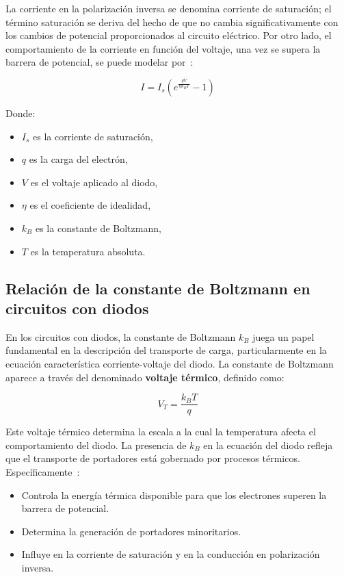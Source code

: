 \documentclass[twocolumn]{article} %
\begin{document}
La corriente en la polarización inversa se denomina corriente de saturación; el término saturación se deriva del hecho de que no cambia significativamente con los cambios de potencial proporcionados al circuito eléctrico. Por otro lado, el comportamiento de la corriente en función del voltaje, una vez se supera la barrera de potencial, se puede modelar por~\cite{leon2014}:

\begin{equation}
I = I_s \left( e^{\frac{qV}{\eta k_B T}} - 1 \right)
\label{corriente}
\end{equation}

Donde:
\begin{itemize}
    \item $I_s$ es la corriente de saturación,
    \item $q$ es la carga del electrón,
    \item $V$ es el voltaje aplicado al diodo,
    \item $\eta$ es el coeficiente de idealidad,
    \item $k_B$ es la constante de Boltzmann,
    \item $T$ es la temperatura absoluta.
\end{itemize}

\subsection{Relación de la constante de Boltzmann en circuitos con diodos}

En los circuitos con diodos, la constante de Boltzmann $k_B$ juega un papel fundamental en la descripción del transporte de carga, particularmente en la ecuación característica corriente-voltaje del diodo. La constante de Boltzmann aparece a través del denominado \textbf{voltaje térmico}, definido como:

\begin{equation}
V_T = \frac{k_B T}{q}
\end{equation}

Este voltaje térmico determina la escala a la cual la temperatura afecta el comportamiento del diodo. La presencia de $k_B$ en la ecuación del diodo refleja que el transporte de portadores está gobernado por procesos térmicos. Específicamente~\cite{leon2014}:

\begin{itemize}
    \item Controla la energía térmica disponible para que los electrones superen la barrera de potencial.
    \item Determina la generación de portadores minoritarios.
    \item Influye en la corriente de saturación y en la conducción en polarización inversa.
\end{itemize}
\end{document}
